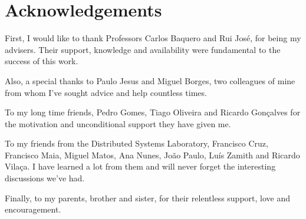 \chapter*{Acknowledgements}

First, I would like to thank Professors Carlos Baquero and Rui José,
for being my advisers. Their support, knowledge and availability were
fundamental to the success of this work.

Also, a special thanks to Paulo Jesus and Miguel Borges, two colleagues
of mine from whom I've sought advice and help countless times.

To my long time friends, Pedro Gomes, Tiago Oliveira and Ricardo
Gonçalves for the motivation and unconditional support they have given
me.

To my friends from the
Distributed Systems Laboratory, Francisco Cruz, Francisco Maia, Miguel
Matos, Ana Nunes, João Paulo, Luís Zamith and Ricardo Vilaça. I have learned a lot
from them and will never forget the interesting discussions we've had.

Finally, to my parents, brother and sister, for their relentless
support, love and encouragement.



\thispagestyle{empty}
